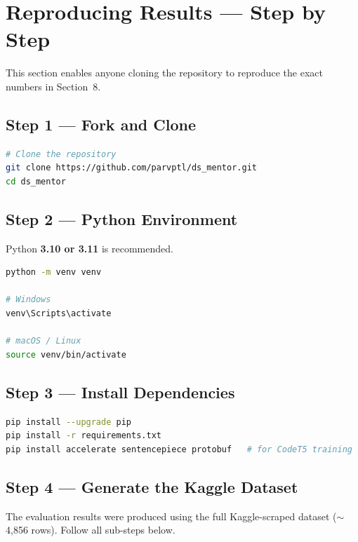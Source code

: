 \documentclass[12pt,a4paper]{article}
\begin{document}
\section{Reproducing Results --- Step by Step}

This section enables anyone cloning the repository to reproduce the exact numbers in Section~8.

\subsection{Step 1 --- Fork and Clone}

\begin{lstlisting}[language=bash]
# Clone the repository
git clone https://github.com/parvptl/ds_mentor.git
cd ds_mentor
\end{lstlisting}

\subsection{Step 2 --- Python Environment}

Python \textbf{3.10 or 3.11} is recommended.

\begin{lstlisting}[language=bash]
python -m venv venv

# Windows
venv\Scripts\activate

# macOS / Linux
source venv/bin/activate
\end{lstlisting}

\subsection{Step 3 --- Install Dependencies}

\begin{lstlisting}[language=bash]
pip install --upgrade pip
pip install -r requirements.txt
pip install accelerate sentencepiece protobuf   # for CodeT5 training
\end{lstlisting}

\subsection{Step 4 --- Generate the Kaggle Dataset}

The evaluation results were produced using the full Kaggle-scraped dataset ($\sim$4,856 rows). Follow all sub-steps below.
\end{document}
